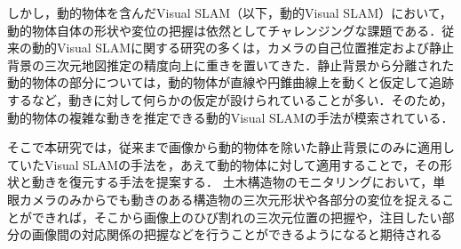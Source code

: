 しかし，動的物体を含んだVisual SLAM（以下，動的Visual SLAM）において，動的物体自体の形状や変位の把握は依然としてチャレンジングな課題である．従来の動的Visual SLAMに関する研究の多くは，カメラの自己位置推定および静止背景の三次元地図推定の精度向上に重きを置いてきた．静止背景から分離された動的物体の部分については，動的物体が直線や円錐曲線上を動くと仮定して追跡する\cite{alcantarilla2012combining,avidan1999trajectory}など，動きに対して何らかの仮定が設けられていることが多い．そのため，動的物体の複雑な動きを推定できる動的Visual SLAMの手法が模索されている．

そこで本研究では，従来まで画像から動的物体を除いた静止背景にのみに適用していたVisual SLAMの手法を，あえて動的物体に対して適用することで，その形状と動きを復元する手法を提案する．
土木構造物のモニタリングにおいて，単眼カメラのみからでも動きのある構造物の三次元形状や各部分の変位を捉えることができれば，そこから画像上のひび割れの三次元位置の把握や，注目したい部分の画像間の対応関係の把握などを行うことができるようになると期待される


